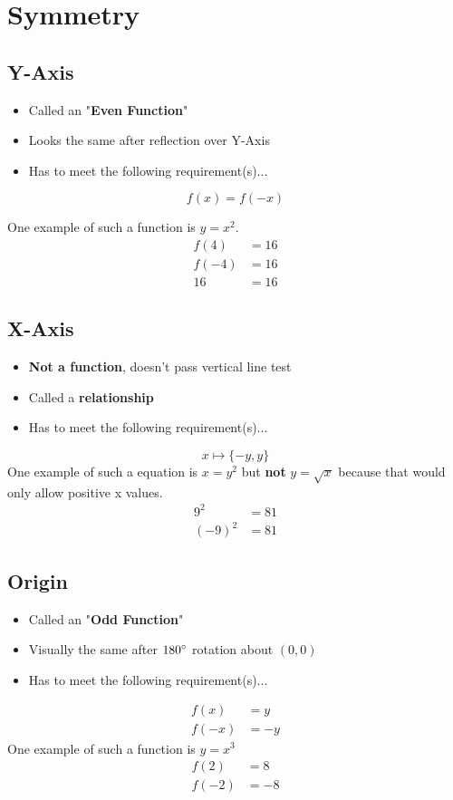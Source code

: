 \documentclass{article}
\newcommand{\bd}{\textbf}
\newcommand{\dquad}{\quad{}\quad{}}
\begin{document}
	\section{Symmetry}
		\subsection{Y-Axis}
			\begin{itemize}[label=\dquad{}--]
				\item Called an "\bd{Even Function}"
				\item Looks the same after reflection over Y-Axis
				\item Has to meet the following requirement(s)...
			\end{itemize}
			\begin{equation}
				f(x) = f(-x)
			\end{equation}
			\par One example of such a function is $y = x^2$.
			\begin{align*}
				f(4) &= 16 \\
				f(-4) &= 16 \\
				16 &= 16
			\end{align*}
		
		\subsection{X-Axis}
			\begin{itemize}[label=\dquad{}--]
				\item \bd{Not a function}, doesn't pass vertical line test
				\item Called a \bd{relationship}
				\item Has to meet the following requirement(s)...
			\end{itemize}
			\begin{equation}
				x \mapsto \{-y,  y\}
			\end{equation}
			One example of such a equation is $x = y^2$ but \bd{not} $y = \sqrt{x}$ because that would only allow positive x values.
			\begin{align*}
				9^2 &= 81 \\
				(-9)^2 &= 81
			\end{align*}
		
		\subsection{Origin}
			\begin{itemize}[label=\dquad{}--]
				\item Called an "\bd{Odd Function}"
				\item Visually the same after $180\degree{}$ rotation about $(0, 0)$
				\item Has to meet the following requirement(s)...
			\end{itemize}
			\begin{align}
				f(x) &= y \\
				f(-x) &= -y
			\end{align}
		One example of such a function is $y = x^3$
		\begin{align*}
			f(2) &= 8 \\
			f(-2) &= -8
		\end{align*}
\end{document}
